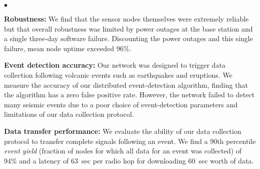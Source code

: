 \begin{list}{$\bullet$}{\setlength{\topsep}{0.05in}
                        \setlength{\leftmargin}{0.15in}
                        \setlength{\itemsep}{0.05in}}

\item 
{\bf Robustness:} We find that the sensor nodes themselves were extremely
reliable but that overall robustness was limited by power outages at the base
station and a single three-day software failure. Discounting the power
outages and this single failure, mean node uptime exceeded 96\%.
%
%
\item 
{\bf Event detection accuracy:} Our network was designed to trigger data
collection following volcanic events such as earthquakes and eruptions. We
measure the accuracy of our distributed event-detection algorithm, finding
that the algorithm has a zero false positive rate. However, the network
failed to detect many seismic events due to a poor choice of event-detection
parameters and limitations of our data collection protocol.
%
%
%
\item 
{\bf Data transfer performance:} We evaluate the ability of our data
collection protocol to transfer complete signals following an event. We find
a 90th percentile {\em event yield} (fraction of nodes for which all data for
an event was collected) of 94\% and a latency of 63~sec per radio hop for
downloading 60~sec worth of data.


\end{list}
